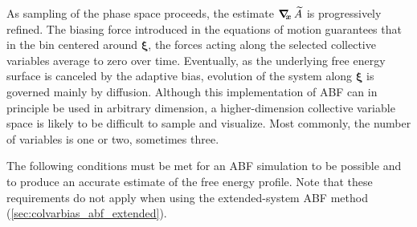 As sampling of the phase space proceeds, the estimate
$\mbox{\boldmath$\nabla_{\!\!x}\,$} \widetilde A$ is progressively refined. The biasing
force introduced in the equations of motion guarantees that in
the bin centered around $\bm{\xi}$,
the forces acting along the selected collective variables average
to zero over time. Eventually, as the underlying free energy surface is canceled
by the adaptive bias, evolution of the system along $\bm{\xi}$
is governed mainly by diffusion.
Although this implementation of ABF can in principle be used in
arbitrary dimension, a higher-dimension collective variable space is likely
to be difficult to sample and visualize.
Most commonly, the number of variables is one or two, sometimes three.



The following conditions must be met for an ABF simulation to be possible and
to produce an accurate estimate of the free energy profile.
Note that these requirements do not apply when using the extended-system
ABF method (\ref{sec:colvarbias_abf_extended}).

